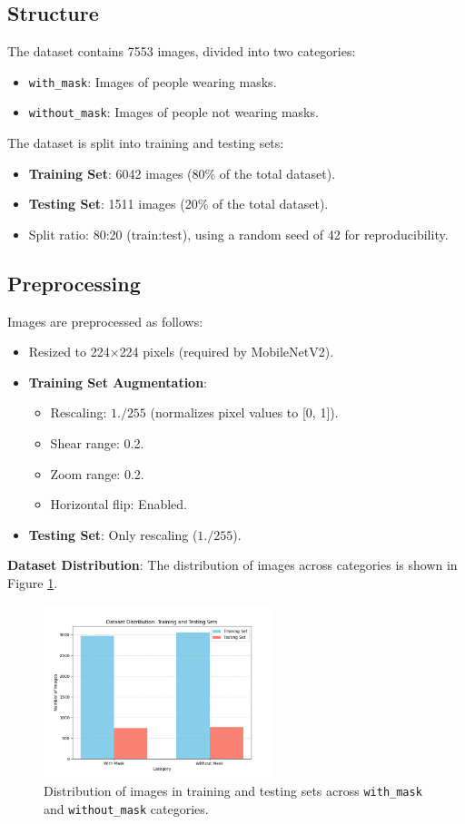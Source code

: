 \documentclass[a4paper,12pt]{article}
\begin{document}
\subsection{Structure}
The dataset contains 7553 images, divided into two categories:
\begin{itemize}
    \item \texttt{with\_mask}: Images of people wearing masks.
    \item \texttt{without\_mask}: Images of people not wearing masks.
\end{itemize}
The dataset is split into training and testing sets:
\begin{itemize}
    \item \textbf{Training Set}: 6042 images (80\% of the total dataset).
    \item \textbf{Testing Set}: 1511 images (20\% of the total dataset).
    \item Split ratio: 80:20 (train:test), using a random seed of 42 for reproducibility.
\end{itemize}

\subsection{Preprocessing}
Images are preprocessed as follows:
\begin{itemize}
    \item Resized to 224$\times$224 pixels (required by MobileNetV2).
    \item \textbf{Training Set Augmentation}:
        \begin{itemize}
            \item Rescaling: $1./255$ (normalizes pixel values to [0, 1]).
            \item Shear range: 0.2.
            \item Zoom range: 0.2.
            \item Horizontal flip: Enabled.
        \end{itemize}
    \item \textbf{Testing Set}: Only rescaling ($1./255$).
\end{itemize}

\textbf{Dataset Distribution}: The distribution of images across categories is shown in Figure \ref{fig:dataset_distribution}.
\begin{figure}[h]
    \centering
    \includegraphics[width=0.6\textwidth]{dataset_distribution}
    \caption{Distribution of images in training and testing sets across \texttt{with\_mask} and \texttt{without\_mask} categories.}
    \label{fig:dataset_distribution}
\end{figure}
\end{document}
